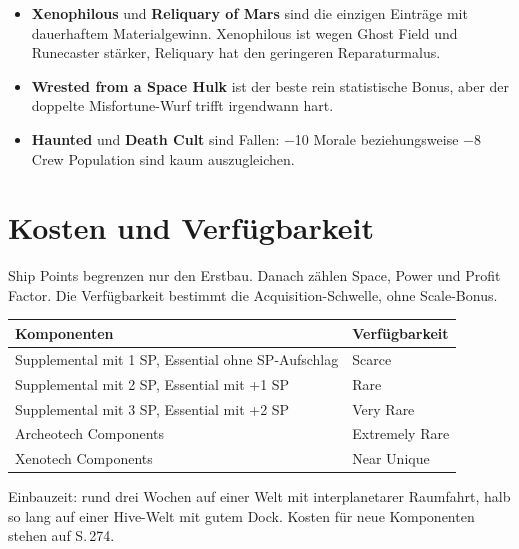 \documentclass[9pt,a4paper]{extarticle}
\newcommand{\nm}[1]{\textbf{#1}}
\newcommand{\src}[1]{\hfill\raisebox{3pt}{\monofont\footnotesize\color{ink3}#1}}
\newenvironment{urteil}{\begin{tcolorbox}[colback=brasssoft,colframe=brass,boxrule=0pt,leftrule=2pt,arc=0pt,left=6pt,right=6pt,top=4pt,bottom=4pt,before skip=6pt,after skip=10pt,title={\monofont\scriptsize\bfseries\color{brass}URTEIL},coltitle=brass,colbacktitle=brasssoft,toptitle=2pt,bottomtitle=0pt,attach title to upper=\par]\begin{itemize}[leftmargin=10pt,itemsep=1pt,parsep=0pt,topsep=2pt]}{\end{itemize}\end{tcolorbox}}
\begin{document}
\begin{urteil}
\item \nm{Xenophilous} und \nm{Reliquary of Mars} sind die einzigen Einträge mit dauerhaftem Materialgewinn. Xenophilous ist wegen Ghost Field und Runecaster stärker, Reliquary hat den geringeren Reparaturmalus.
\item \nm{Wrested from a Space Hulk} ist der beste rein statistische Bonus, aber der doppelte Misfortune-Wurf trifft irgendwann hart.
\item \nm{Haunted} und \nm{Death Cult} sind Fallen: −10 Morale beziehungsweise −8 Crew Population sind kaum auszugleichen.
\end{urteil}

\section{Kosten und Verfügbarkeit \src{S. 207, Tabelle 8-8}}
Ship Points begrenzen nur den Erstbau. Danach zählen Space, Power und Profit Factor. Die Verfügbarkeit bestimmt die Acquisition-Schwelle, ohne Scale-Bonus.

\begin{xltabular}{\linewidth}{Y l}
\toprule
{}\textbf{Komponenten} & \textbf{Verfügbarkeit}\\
\midrule
\endhead
Supplemental mit 1 SP, Essential ohne SP-Aufschlag & Scarce\\
Supplemental mit 2 SP, Essential mit +1 SP & Rare\\
Supplemental mit 3 SP, Essential mit +2 SP & Very Rare\\
Archeotech Components & Extremely Rare\\
Xenotech Components & Near Unique\\
\bottomrule
\end{xltabular}

{\footnotesize\color{ink3}Einbauzeit: rund drei Wochen auf einer Welt mit interplanetarer Raumfahrt, halb so lang auf einer Hive-Welt mit gutem Dock. Kosten für neue Komponenten stehen auf S.\,274.\par}
\end{document}
